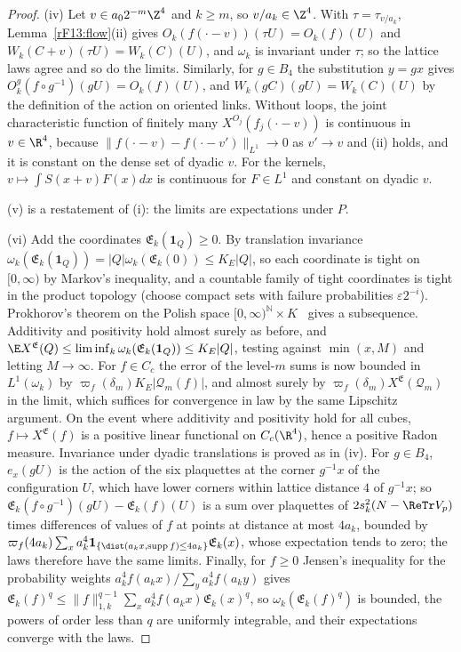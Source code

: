 \begin{proof}
(iv) Let $v\in a_02^{-m}\Z^4$ and $k\ge m$, so $v/a_k\in\Z^4$. With
$\tau=\tau_{v/a_k}$, Lemma~\ref{rF13:flow}(ii) gives
$O_k(f(\cdot-v))(\tau U)=O_k(f)(U)$ and $W_k(C+v)(\tau U)=W_k(C)(U)$, and
$\omega_k$ is invariant under $\tau$; so the lattice laws agree and so do
the limits. Similarly, for $g\in B_4$ the substitution $y=gx$ gives
$O^g_k(f\circ g^{-1})(gU)=O_k(f)(U)$, and $W_k(gC)(gU)=W_k(C)(U)$ by the
definition of the action on oriented links. Without loops, the joint
characteristic function of finitely many $X^{O_j}(f_j(\cdot-v))$ is
continuous in $v\in\R^4$, because $\|f(\cdot-v)-f(\cdot-v')\|_{L^1}\to0$ as
$v'\to v$ and (ii) holds, and it is constant on the dense set of dyadic $v$.
For the kernels, $v\mapsto\int S(x+v)F(x)dx$ is continuous for $F\in L^1$
and constant on dyadic $v$.

(v) is a restatement of (i): the limits are expectations under $P$.

(vi) Add the coordinates $\mathfrak E_k(\mathbf 1_Q)\ge0$. By translation
invariance $\omega_k(\mathfrak E_k(\mathbf 1_Q))=|Q|\omega_k(\mathfrak E_k(0))
\le K_E|Q|$, so each coordinate is tight on $[0,\infty)$ by Markov's
inequality, and a countable family of tight coordinates is tight in the
product topology (choose compact sets with failure probabilities
$\varepsilon2^{-i}$). Prokhorov's theorem on the Polish space $[0,\infty)^{\mathbb
N}\times K$~\cite{Kal21} gives a subsequence. Additivity and positivity hold
almost surely as before, and $\E X^{\mathfrak E}(Q)\le\liminf_k\omega_k(
\mathfrak E_k(\mathbf 1_Q))\le K_E|Q|$, testing against $\min(x,M)$ and
letting $M\to\infty$. For $f\in C_c$ the error of the level-$m$ sums is now
bounded in $L^1(\omega_k)$ by $\varpi_f(\delta_m)K_E|\mathcal Q_m(f)|$, and
almost surely by $\varpi_f(\delta_m)X^{\mathfrak E}(\mathcal Q_m)$ in the limit,
which suffices for convergence in law by the same Lipschitz argument. On the
event where additivity and positivity hold for all cubes, $f\mapsto
X^{\mathfrak E}(f)$ is a positive linear functional on $C_c(\R^4)$, hence a
positive Radon measure. Invariance under dyadic translations is proved as in (iv). For $g\in B_4$, $e_x(gU)$ is the action of the six plaquettes at
the corner $g^{-1}x$ of the configuration $U$, which have lower corners
within lattice distance $4$ of $g^{-1}x$; so $\mathfrak E_k(f\circ g^{-1})
(gU)-\mathfrak E_k(f)(U)$ is a sum over plaquettes of $2s_k^2(N-\ReTr V_p)$
times differences of values of $f$ at points at distance at most $4a_k$,
bounded by $\varpi_f(4a_k)\sum_xa_k^4\mathbf 1_{\{\dist(a_kx,\operatorname{supp}f)\le4a_k\}}
\mathfrak E_k(x)$, whose expectation tends to zero; the laws therefore
have the same limits. Finally, for
$f\ge0$ Jensen's inequality for the probability weights $a_k^4f(a_kx)/
\sum_ya_k^4f(a_ky)$ gives $\mathfrak E_k(f)^q\le\|f\|_{1,k}^{q-1}\sum_xa_k^4
f(a_kx)\mathfrak E_k(x)^q$, so $\omega_k(\mathfrak E_k(f)^q)$ is bounded,
the powers of order less than $q$ are uniformly integrable, and their
expectations converge with the laws.
\end{proof}

